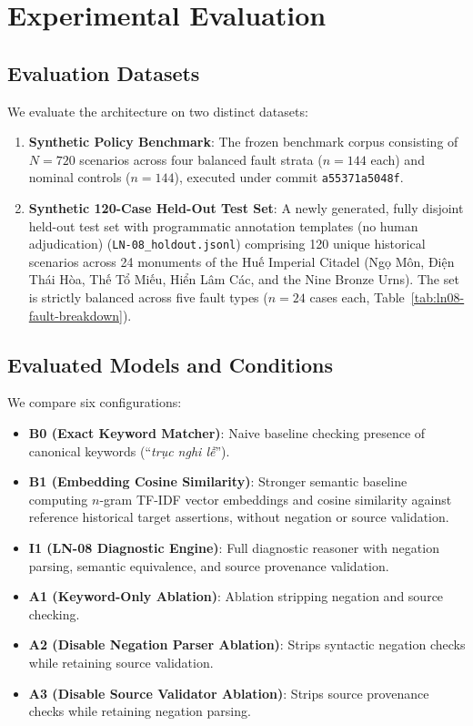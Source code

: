 \documentclass[11pt,a4paper]{article}
\begin{document}
\section{Experimental Evaluation}

\subsection{Evaluation Datasets}
We evaluate the architecture on two distinct datasets:
\begin{enumerate}[leftmargin=*]
    \item \textbf{Synthetic Policy Benchmark}: The frozen benchmark corpus consisting of $N=720$ scenarios across four balanced fault strata ($n=144$ each) and nominal controls ($n=144$), executed under commit \texttt{a55371a5048f}.
    \item \textbf{Synthetic 120-Case Held-Out Test Set}: A newly generated, fully disjoint held-out test set with programmatic annotation templates (no human adjudication) (\texttt{LN-08\_holdout.jsonl}) comprising 120 unique historical scenarios across 24 monuments of the Huế Imperial Citadel (Ngọ Môn, Điện Thái Hòa, Thế Tổ Miếu, Hiển Lâm Các, and the Nine Bronze Urns). The set is strictly balanced across five fault types ($n=24$ cases each, Table~\ref{tab:ln08-fault-breakdown}).
\end{enumerate}

\subsection{Evaluated Models and Conditions}
We compare six configurations:
\begin{itemize}[leftmargin=*]
    \item \textbf{B0 (Exact Keyword Matcher)}: Naive baseline checking presence of canonical keywords (``\textit{trục nghi lễ}'').
    \item \textbf{B1 (Embedding Cosine Similarity)}: Stronger semantic baseline computing $n$-gram TF-IDF vector embeddings and cosine similarity against reference historical target assertions, without negation or source validation.
    \item \textbf{I1 (LN-08 Diagnostic Engine)}: Full diagnostic reasoner with negation parsing, semantic equivalence, and source provenance validation.
    \item \textbf{A1 (Keyword-Only Ablation)}: Ablation stripping negation and source checking.
    \item \textbf{A2 (Disable Negation Parser Ablation)}: Strips syntactic negation checks while retaining source validation.
    \item \textbf{A3 (Disable Source Validator Ablation)}: Strips source provenance checks while retaining negation parsing.
\end{itemize}
\end{document}
